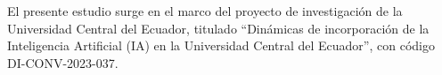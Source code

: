 \documentclass[spanish]{textolivre}
\begin{document}
\begin{dataavailability}
\end{dataavailability}

\begin{funding}
El presente estudio surge en el marco del proyecto de investigación de la Universidad Central del Ecuador, titulado ``Dinámicas de incorporación de la Inteligencia Artificial (IA) en la Universidad Central del Ecuador'', con código DI-CONV-2023-037.
\end{funding}
\end{document}
